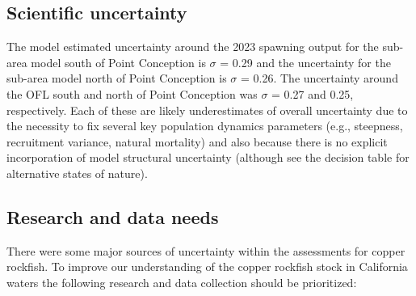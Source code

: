 \documentclass[11pt,
  english,
  letterpaper,
]{article}
\begin{document}
\pagebreak

\hypertarget{scientific-uncertainty}{%
\subsection*{Scientific uncertainty}\label{scientific-uncertainty}}

The model estimated uncertainty around the 2023 spawning output for the sub-area model south of Point Conception is \(\sigma\) = 0.29 and the uncertainty for the sub-area model north of Point Conception is \(\sigma\) = 0.26. The uncertainty around the OFL south and north of Point Conception was \(\sigma\) = 0.27 and 0.25, respectively. Each of these are likely underestimates of overall uncertainty due to the necessity to fix several key population dynamics parameters (e.g., steepness, recruitment variance, natural mortality) and also because there is no explicit incorporation of model structural uncertainty (although see the decision table for alternative states of nature).

\hypertarget{research-and-data-needs}{%
\subsection*{Research and data needs}\label{research-and-data-needs}}

There were some major sources of uncertainty within the assessments for copper rockfish. To improve our understanding of the copper rockfish stock in California waters the following research and data collection should be prioritized:
\end{document}
